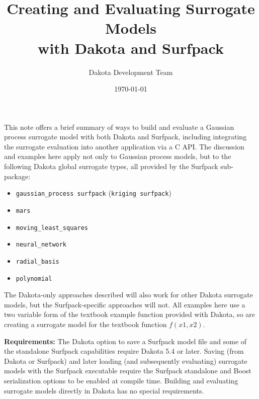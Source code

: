 \documentclass{article}
\begin{document}
\title{Creating and Evaluating Surrogate Models\\with Dakota and Surfpack}
\author{Dakota Development Team}
\date{\today}

\maketitle

This note offers a brief summary of ways to build and evaluate a
Gaussian process surrogate model with both Dakota and Surfpack,
including integrating the surrogate evaluation into another
application via a C API.  The discussion and examples here apply not
only to Gaussian process models, but to the following Dakota global
surrogate types, all provided by the Surfpack sub-package:
\begin{itemize}
\item {\tt gaussian\_process surfpack} ({\tt kriging surfpack})
\item {\tt mars} 
\item {\tt moving\_least\_squares}
\item {\tt neural\_network}
\item {\tt radial\_basis}
\item {\tt polynomial}
\end{itemize}
The Dakota-only approaches described will also work for other Dakota
surrogate models, but the Surfpack-specific approaches will not.  All
examples here use a two variable form of the textbook example function
provided with Dakota, so are creating a surrogate model for the
textbook function $f(x1, x2)$.

{\bf Requirements:} The Dakota option to save a Surfpack model file
and some of the standalone Surfpack capabilities require Dakota 5.4 or
later.  Saving (from Dakota or Surfpack) and later loading (and
subsequently evaluating) surrogate models with the Surfpack executable
require the Surfpack standalone and Boost serialization options to be
enabled at compile time.  Building and evaluating surrogate models
directly in Dakota has no special requirements.
\end{document}
